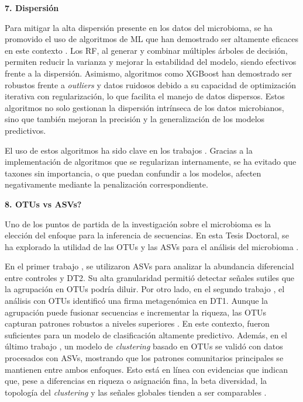 \textbf{7. Dispersión}

Para mitigar la alta dispersión presente en los datos del microbioma, se ha promovido el uso de algoritmos de ML que han demostrado ser altamente eficaces en este contexto \cite{goodswen2021machine, Lin2023MicrobiomeObesitySignatures}. Los RF, al generar y combinar múltiples árboles de decisión, permiten reducir la varianza y mejorar la estabilidad del modelo, siendo efectivos frente a la dispersión. Asimismo, algoritmos como XGBoost han demostrado ser robustos frente a \textit{outliers} y datos ruidosos debido a su capacidad de optimización iterativa con regularización, lo que facilita el manejo de datos dispersos. Estos algoritmos no solo gestionan la dispersión intrínseca de los datos microbianos, sino que también mejoran la precisión y la generalización de los modelos predictivos.

El uso de estos algoritmos ha sido clave en los trabajos \cite{paper2, paper3}. Gracias a la implementación de algoritmos que se regularizan internamente, se ha evitado que taxones sin importancia, o que puedan confundir a los modelos, afecten negativamente mediante la penalización correspondiente.

\textbf{8. OTUs vs ASVs?}

Uno de los puntos de partida de la investigación sobre el microbioma es la elección del enfoque para la inferencia de secuencias. En esta Tesis Doctoral, se ha explorado la utilidad de las OTUs y las ASVs para el análisis del microbioma \cite{paper1, paper2, paper3}.

En el primer trabajo \cite{paper1}, se utilizaron ASVs para analizar la abundancia diferencial entre controles y DT2. Su alta granularidad permitió detectar señales sutiles que la agrupación en OTUs podría diluir. Por otro lado, en el segundo trabajo \cite{paper2}, el análisis con OTUs identificó una firma metagenómica en DT1. Aunque la agrupación puede fusionar secuencias e incrementar la riqueza, las OTUs capturan patrones robustos a niveles superiores \cite{liu2023independent}. En este contexto, fueron suficientes para un modelo de clasificación altamente predictivo. Además, en el último trabajo \cite{paper3}, un modelo de \textit{clustering} basado en OTUs se validó con datos procesados con ASVs, mostrando que los patrones comunitarios principales se mantienen entre ambos enfoques. Esto está en línea con evidencias que indican que, pese a diferencias en riqueza o asignación fina, la beta diversidad, la topología del \textit{clustering} y las señales globales tienden a ser comparables \cite{chiarello2022ranking}.

